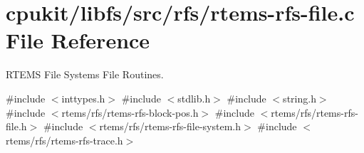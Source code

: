 \hypertarget{rtems-rfs-file_8c}{}\section{cpukit/libfs/src/rfs/rtems-\/rfs-\/file.c File Reference}
\label{rtems-rfs-file_8c}


R\+T\+E\+MS File Systems File Routines.  


{\ttfamily \#include $<$inttypes.\+h$>$}\newline
{\ttfamily \#include $<$stdlib.\+h$>$}\newline
{\ttfamily \#include $<$string.\+h$>$}\newline
{\ttfamily \#include $<$rtems/rfs/rtems-\/rfs-\/block-\/pos.\+h$>$}\newline
{\ttfamily \#include $<$rtems/rfs/rtems-\/rfs-\/file.\+h$>$}\newline
{\ttfamily \#include $<$rtems/rfs/rtems-\/rfs-\/file-\/system.\+h$>$}\newline
{\ttfamily \#include $<$rtems/rfs/rtems-\/rfs-\/trace.\+h$>$}\newline
